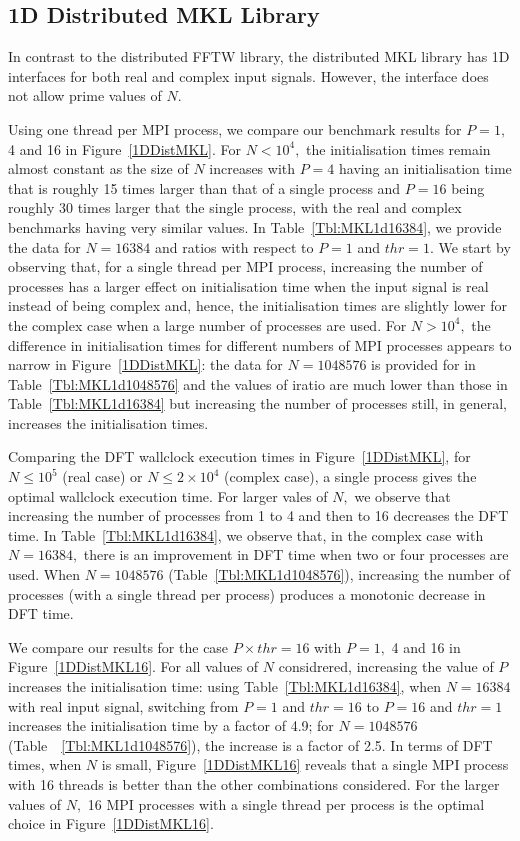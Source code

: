 \documentclass[a4paper]{article}
\begin{document}
\subsection{1D Distributed MKL Library}\label{Sec:1DDistMKL}
In contrast to the distributed FFTW library, the distributed MKL
library has 1D interfaces for both real and complex input
signals. However, the interface does not allow prime values of $N.$


Using one thread per MPI process, we compare our benchmark results for
$P=1,$ 4 and 16 in Figure~\ref{1DDistMKL}. For $N<10^4,$ the
initialisation times remain almost constant as the size of $N$
increases with $P=4$ having an initialisation time that is roughly 15
times larger than that of a single process and $P=16$ being roughly 30
times larger that the single process, with the real and complex
benchmarks having very similar values. In Table~\ref{Tbl:MKL1d16384},
we provide the data for $N=16384$ and ratios with respect to $P=1$ and
$thr=1.$ We start by observing that, for a single thread per MPI
process, increasing the number of processes has a larger effect on
initialisation time when the input signal is real instead of being
complex and, hence, the initialisation times are slightly lower for
the complex case when a large number of processes are used. For
$N>10^4,$ the difference in initialisation times for different numbers
of MPI processes appears to narrow in Figure~\ref{1DDistMKL}: the data
for $N=1048576$ is provided for in Table~\ref{Tbl:MKL1d1048576} and
the values of iratio are much lower than those in
Table~\ref{Tbl:MKL1d16384} but increasing the number of processes
still, in general, increases the initialisation times.

Comparing the DFT wallclock execution times in Figure~\ref{1DDistMKL},
for $N\le 10^5$ (real case) or $N\le 2\times 10^4$ (complex case), a
single process gives the optimal wallclock execution time. For larger
vales of $N,$ we observe that increasing the number of processes from
1 to 4 and then to 16 decreases the DFT time. In
Table~\ref{Tbl:MKL1d16384}, we observe that, in the complex case with
$N=16384,$ there is an improvement in DFT time when two or four
processes are used. When $N=1048576$ (Table~\ref{Tbl:MKL1d1048576}),
increasing the number of processes (with a single thread per process)
produces a monotonic decrease in DFT time.

We compare our results for the case $P\times thr=16$ with $P=1,$ 4 and
16 in Figure~\ref{1DDistMKL16}. For all values of $N$ considrered,
increasing the value of $P$ increases the initialisation time: using
Table~\ref{Tbl:MKL1d16384}, when $N=16384$ with real input signal,
switching from $P=1$ and $thr=16$ to $P=16$ and $thr=1$ increases the
initialisation time by a factor of 4.9; for $N=1048576$
(Table~~\ref{Tbl:MKL1d1048576}), the increase is a factor of 2.5. In
terms of DFT times, when $N$ is small, Figure~\ref{1DDistMKL16}
reveals that a single MPI process with 16 threads is better than the
other combinations considered. For the larger values of $N,$ 16 MPI
processes with a single thread per process is the optimal choice in
Figure~\ref{1DDistMKL16}. 
\end{document}
